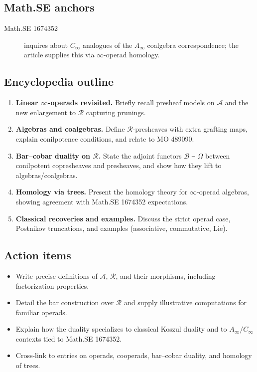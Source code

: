 \subsection*{Math.SE anchors}
\begin{description}
  \item[Math.SE 1674352] inquires about $C_\infty$ analogues of the $A_\infty$ coalgebra correspondence; the article supplies this via $\infty$-operad homology.
\end{description}
\subsection*{Encyclopedia outline}
\begin{enumerate}
  \item \textbf{Linear $\infty$-operads revisited.} Briefly recall presheaf models on $\mathcal{A}$ and the new enlargement to $\mathcal{R}$ capturing prunings.
  \item \textbf{Algebras and coalgebras.} Define $\mathcal{R}$-presheaves with extra grafting maps, explain conilpotence conditions, and relate to MO 489090.
  \item \textbf{Bar--cobar duality on $\mathcal{R}$.} State the adjoint functors $\mathcal{B}\dashv\Omega$ between conilpotent copresheaves and presheaves, and show how they lift to algebras/coalgebras.
  \item \textbf{Homology via trees.} Present the homology theory for $\infty$-operad algebras, showing agreement with Math.SE 1674352 expectations.
  \item \textbf{Classical recoveries and examples.} Discuss the strict operad case, Postnikov truncations, and examples (associative, commutative, Lie).
\end{enumerate}
\subsection*{Action items}
\begin{itemize}
  \item Write precise definitions of $\mathcal{A}$, $\mathcal{R}$, and their morphisms, including factorization properties.
  \item Detail the bar construction over $\mathcal{R}$ and supply illustrative computations for familiar operads.
  \item Explain how the duality specializes to classical Koszul duality and to $A_\infty/C_\infty$ contexts tied to Math.SE 1674352.
  \item Cross-link to entries on operads, cooperads, bar--cobar duality, and homology of trees.
\end{itemize}
